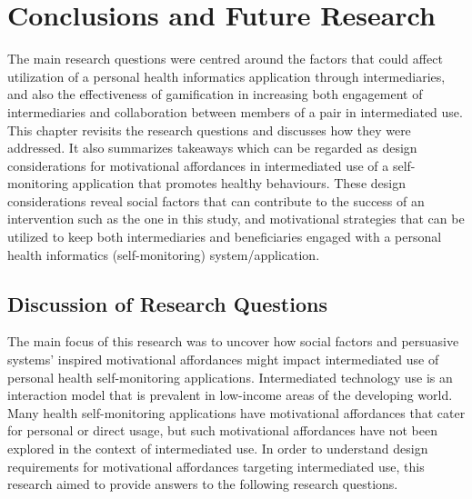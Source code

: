 
\chapter{Conclusions and Future Research} %

\label{discussionchapter} %


The main research questions were centred around the factors that could affect utilization of a personal health informatics application through intermediaries, and also the effectiveness of gamification in increasing both engagement of intermediaries and collaboration between members of a pair in intermediated use. This chapter revisits the research questions and discusses how they were addressed. It also summarizes takeaways which can be regarded as design considerations for motivational affordances in intermediated use of a self-monitoring application that promotes healthy behaviours. These design considerations reveal social factors that can contribute to the success of an intervention such as the one in this study, and motivational strategies that can be utilized to keep both intermediaries and beneficiaries engaged with a personal health informatics (self-monitoring) system/application.

\section{Discussion of Research Questions}
The main focus of this research was to uncover how social factors and persuasive systems' inspired motivational affordances might impact intermediated use of personal health self-monitoring applications. Intermediated technology use is an interaction model that is prevalent in low-income areas of the developing world. Many health self-monitoring applications have motivational affordances that cater for personal or direct usage, but such motivational affordances have not been explored in the context of intermediated use. In order to understand design requirements for motivational affordances targeting intermediated use, this research aimed to provide answers to the following research questions.

